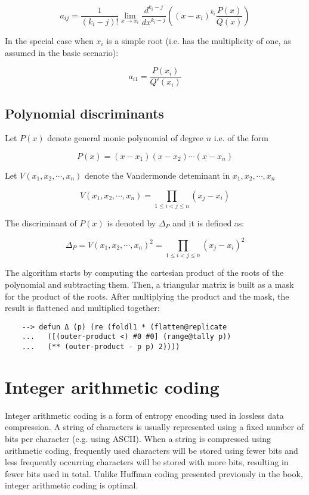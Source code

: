 $$
{\displaystyle a_{ij}={\frac {1}{(k_{i}-j)!}}\lim _{x\to x_{i}}{\frac {d^{k_{i}-j}}{dx^{k_{i}-j}}}\left((x-x_{i})^{k_{i}}\frac{P(x)}{Q(x)}\right)}
$$

In the special case when $x_i$ is a simple root (i.e. has the multiplicity of one, as assumed in the basic scenario):

$$
a_{i1}={\frac {P(x_{i})}{Q'(x_{i})}}
$$

\subsection{Polynomial discriminants}

Let $P(x)$ denote general monic polynomial of degree $n$ i.e. of the form

$$
P(x) = (x-x_1)(x-x_2) \cdots (x-x_n)
$$

\noindent Let $V(x_1,x_2, \cdots, x_n)$ denote the Vandermonde deteminant in $x_1,x_2, \cdots, x_n$

$$
V(x_1,x_2, \cdots , x_n) = \prod\limits_{1 \leq i < j \leq n} (x_j - x_i)
$$

\noindent The discriminant of $P(x)$ is denoted by $\Delta_P$ and it is defined as:

$$
\Delta_P = V(x_1,x_2, \cdots , x_n)^2 = \prod\limits_{1 \leq i < j \leq n} (x_j - x_i)^2
$$

The algorithm starts by computing the cartesian product of the roots of the polynomial and subtracting them. Then, a triangular matrix is built as a mask for the product of the roots. After multiplying the product and the mask, the result is flattened and multiplied together:

\begin{Verbatim}
    --> defun Δ (p) (re (foldl1 * (flatten@replicate
    ...   ([(outer-product <) #0 #0] (range@tally p))
    ...   (** (outer-product - p p) 2))))
\end{Verbatim}

\section{Integer arithmetic coding}

Integer arithmetic coding is a form of entropy encoding used in lossless data compression. A string of characters is usually represented using a fixed number of bits per character (e.g. using ASCII). When a string is compressed using arithmetic coding, frequently used characters will be stored using fewer bits and less frequently occurring characters will be stored with more bits, resulting in fewer bits used in total. Unlike Huffman coding presented previously in the book, integer arithmetic coding is optimal.

